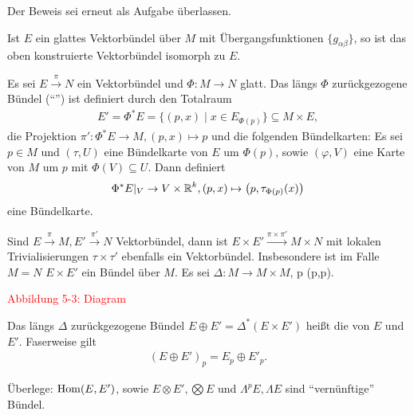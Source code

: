 Der Beweis sei erneut als Aufgabe überlassen.

\begin{kor}
  Ist $E$ ein glattes Vektorbündel über $M$ mit Übergangsfunktionen $\{g_{\alpha\beta}\}$, so ist das oben konstruierte Vektorbündel isomorph zu $E$.
\end{kor}

Es sei $E \xrightarrow{\pi} N$ ein Vektorbündel und $\Phi \colon M \to N$ glatt.
Das längs $\Phi$ zurückgezogene Bündel ("`"') ist definiert durch den Totalraum
\begin{align*}
  E' = \Phi^{\ast}E = \{(p,x) \mid x \in E_{\Phi(p)}\} \subseteq M \times E,
\end{align*}
die Projektion $\pi' \colon \Phi^{\ast}E \to M, (p,x) \mapsto p$ und die folgenden Bündelkarten:
Es sei $p \in M$ und $(\tau, U)$ eine Bündelkarte von $E$ um $\Phi(p)$, sowie $(\varphi,V)$ eine Karte von $M$ um $p$ mit $\Phi(V) \subseteq U$.
Dann definiert 
\begin{align*}
  \Phi^{\ast}E|_V \to V \times \operatorname{\mathbb{R}}^k, (p,x) \mapsto \left(p, \tau_{\Phi(p)}(x)\right)
\end{align*}
eine Bündelkarte.

Sind $E \xrightarrow{\pi} M, E' \xrightarrow{\pi'} N$ Vektorbündel, dann ist $E \times E' \xrightarrow{\pi \times \pi'} M \times N$ mit lokalen Trivialisierungen $\tau \times \tau'$ ebenfalls ein Vektorbündel.
Insbesondere ist im Falle $M = N$ $E \times E'$ ein Bündel über $M$.
Es sei $\Delta \colon M \to M \times M$, p \mapsto (p,p).

\textcolor{red}{Abbildung 5-3: Diagram}

Das längs $\Delta$ zurückgezogene Bündel $E \oplus E' = \Delta^{\ast}(E \times E')$ heißt die  von $E$ und $E'$.
Faserweise gilt
\begin{align*}
  (E \oplus E')_p = E_p \oplus E'_p.
\end{align*}
 
Überlege: $\operatorname{Hom}(E,E')$, sowie $E \otimes E', \bigotimes E$ und $\Lambda^pE, \Lambda E$ sind "`vernünftige"' Bündel.


